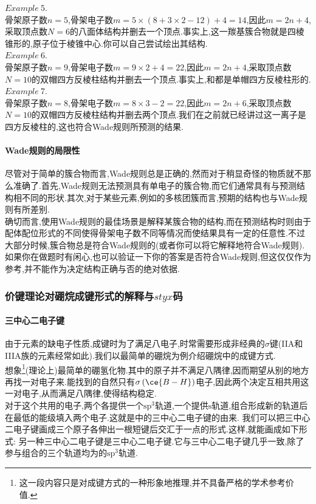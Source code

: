 \documentclass{ctexart}
\begin{document}
$\mathit{Example\ 5.}$\ \\
\indent 骨架原子数$n=5$,骨架电子数$m=5\times(8+3\times2-12)+4=14$,因此$m=2n+4$,采取顶点数$N=6$的八面体结构并删去一个顶点.事实上,这一羰基簇合物就是四棱锥形的,原子位于棱锥中心.你可以自己尝试绘出其结构.\\
$\mathit{Example\ 6.}$\ \\
\indent 骨架原子数$n=9$,骨架电子数$m=9\times2+4=22$,因此$m=2n+4$,采取顶点数$N=10$的双帽四方反棱柱结构并删去一个顶点.事实上,和都是单帽四方反棱柱形的.
$\mathit{Example\ 7.}$\ \\
\indent 骨架原子数$n=8$,骨架电子数$m=8\times3-2=22$,因此$m=2n+6$,采取顶点数$N=10$的双帽四方反棱柱结构并删去两个顶点.我们在之前就已经讲过这一离子是四方反棱柱的,这也符合Wade规则所预测的结果.
\paragraph{Wade规则的局限性}
尽管对于简单的簇合物而言,Wade规则总是正确的,然而对于稍显奇怪的物质就不那么准确了.首先,Wade规则无法预测具有单电子的簇合物,而它们通常具有与预测结构相不同的形状.其次,对于某些元素,例如的多核团簇而言,预期的结构也与Wade规则有所差别.\\
\indent 确切而言,使用Wade规则的最佳场景是解释某簇合物的结构,而在预测结构时则由于配体配位形式的不同使得骨架电子数不同等情况而使结果具有一定的任意性.不过大部分时候,簇合物总是符合Wade规则的(或者你可以将它解释地符合Wade规则).如果你在做题时有闲心,也可以验证一下你的答案是否符合Wade规则,但这仅仅作为参考,并不能作为决定结构正确与否的绝对依据.
\subsubsection{价键理论对硼烷成键形式的解释与$styx$码}
\paragraph{三中心二电子键}
由于元素的缺电子性质,成键时为了满足八电子,时常需要形成非经典的$\sigma$键(IIA和IIIA族的元素经常如此).我们以最简单的硼烷为例介绍硼烷中的成键方式.\\
\indent 想象\footnote{这一段内容只是对成键方式的一种形象地推理,并不具备严格的学术参考价值.}(理论上)最简单的硼氢化物.其中的原子并不满足八隅律,因而期望从别的地方再找一对电子来.能找到的自然只有$\sigma\left(\ce{B-H}\right)$电子,因此两个决定互相共用这一对电子,从而满足八隅律,使得结构稳定.\\
\indent 对于这个共用的电子,两个各提供一个$\text{sp}^3$轨道,一个提供$\text{s}$轨道,组合形成新的轨道后在最低的能级填入两个电子.这就是中的三中心二电子键的由来.
我们可以把三中心二电子键画成三个原子各伸出一根短键后交汇于一点的形式.这样,就能画成如下形式:
另一种三中心二电子键是三中心二电子键.它与三中心二电子键几乎一致,除了参与组合的三个轨道均为的$\text{sp}^3$轨道.
\end{document}
